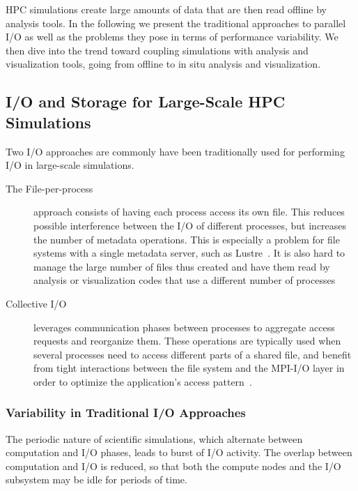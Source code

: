 HPC simulations create large amounts of data that are then read offline by analysis tools. 
In the following we present the traditional approaches to parallel I/O as well
as the problems they pose in terms of performance variability. We then dive into the trend toward
coupling simulations with analysis and visualization tools, going from offline to in situ analysis and
visualization.

\subsection{I/O and Storage for Large-Scale HPC Simulations}
			
			Two I/O approaches are commonly have been traditionally used for performing I/O in large-scale simulations.
%
			\begin{description}
		
			\item[The File-per-process] approach consists of having each process access its own file.
			This reduces possible interference between the I/O of different processes, but  increases the number of metadata operations. 
			This is especially a problem for file systems with a single metadata server, such as Lustre~\cite{schwan2003lustre}. 
			It is also hard to manage the large number of files thus created and have them read by  analysis or visualization 
			codes that use a different number of processes
			
			\item[Collective I/O] leverages communication phases between
			processes to aggregate access requests and reorganize them. These operations
			are typically used when several processes need to access different parts
			of a shared file, and benefit from tight interactions between the file system
			and the MPI-I/O layer in order to optimize the application's access pattern~\cite{prost2006mpi}.
			
			\end{description}
%
			\subsubsection{Variability in Traditional I/O Approaches}

			The periodic nature of scientific simulations, which alternate between computation and I/O phases,
			leads to burst of I/O activity. The overlap between computation and I/O is reduced, so that both the compute 
			nodes and the I/O subsystem may be idle for periods of time.
		
